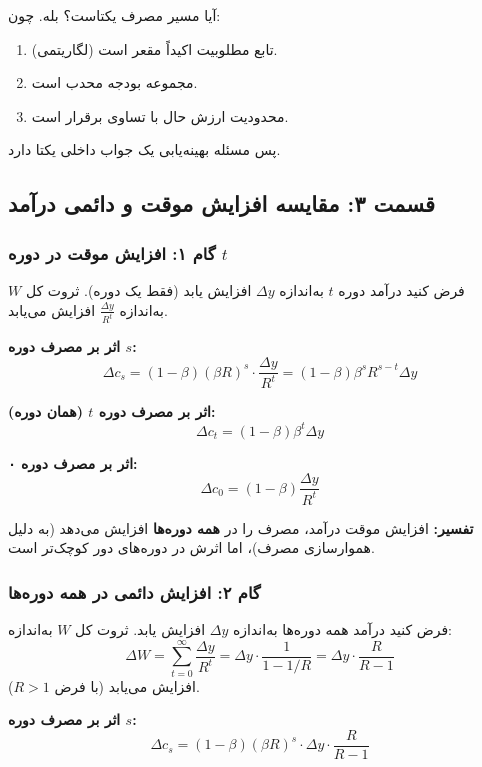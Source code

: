 \documentclass[12pt,a4paper]{article}
\begin{document}
آیا مسیر مصرف یکتاست؟ بله. چون:

\begin{enumerate}
	\item تابع مطلوبیت اکیداً مقعر است (لگاریتمی).
	\item مجموعه بودجه محدب است.
	\item محدودیت ارزش حال با تساوی برقرار است.
\end{enumerate}

پس مسئله بهینه‌یابی یک جواب داخلی یکتا دارد.

\subsection{قسمت ۳: مقایسه افزایش موقت و دائمی درآمد}

\subsubsection{گام ۱: افزایش موقت در دوره $t$}

فرض کنید درآمد دوره $t$ به‌اندازه $\Delta y$ افزایش یابد (فقط یک دوره). ثروت کل $W$ به‌اندازه $\frac{\Delta y}{R^t}$ افزایش می‌یابد.

\textbf{اثر بر مصرف دوره $s$:}
\[
	\Delta c_s = (1-\beta)(\beta R)^s \cdot \frac{\Delta y}{R^t} = (1-\beta) \beta^s R^{s-t} \Delta y
\]

\textbf{اثر بر مصرف دوره $t$ (همان دوره):}
\[
	\Delta c_t = (1-\beta) \beta^t \Delta y
\]

\textbf{اثر بر مصرف دوره ۰:}
\[
	\Delta c_0 = (1-\beta) \frac{\Delta y}{R^t}
\]

\textbf{تفسیر:} افزایش موقت درآمد، مصرف را در \textbf{همه دوره‌ها} افزایش می‌دهد (به دلیل هموارسازی مصرف)، اما اثرش در دوره‌های دور کوچک‌تر است.

\subsubsection{گام ۲: افزایش دائمی در همه دوره‌ها}

فرض کنید درآمد همه دوره‌ها به‌اندازه $\Delta y$ افزایش یابد. ثروت کل $W$ به‌اندازه:
\[
	\Delta W = \sum_{t=0}^{\infty} \frac{\Delta y}{R^t} = \Delta y \cdot \frac{1}{1 - 1/R} = \Delta y \cdot \frac{R}{R-1}
\]
افزایش می‌یابد (با فرض $R > 1$).

\textbf{اثر بر مصرف دوره $s$:}
\[
	\Delta c_s = (1-\beta)(\beta R)^s \cdot \Delta y \cdot \frac{R}{R-1}
\]
\end{document}
